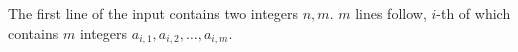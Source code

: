 The first line of the input contains two integers $n,m$.
$m$ lines follow, $i$-th of which contains $m$ integers $a_{i,1},a_{i,2},\ldots,a_{i,m}$.